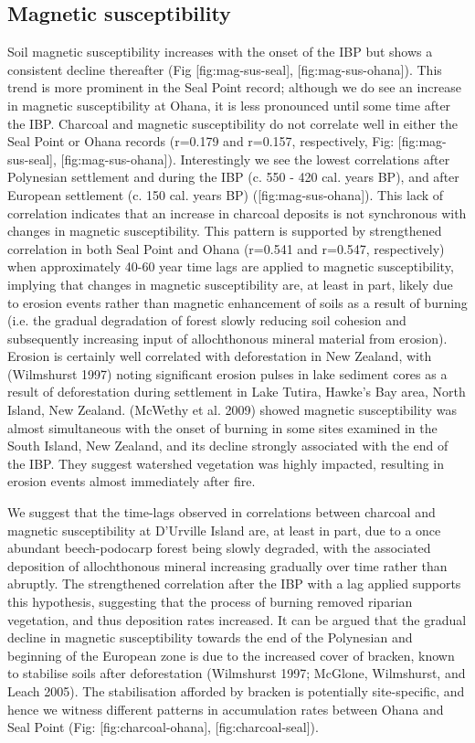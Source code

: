\documentclass[]{article}
\begin{document}
\subsection{Magnetic susceptibility}\label{magnetic-susceptibility-2}

Soil magnetic susceptibility increases with the onset of the IBP but shows a consistent decline thereafter (Fig {[}fig:mag-sus-seal{]}, {[}fig:mag-sus-ohana{]}). This trend is more prominent in the Seal Point record; although we do see an increase in magnetic susceptibility at Ohana, it is less pronounced until some time after the IBP. Charcoal and magnetic susceptibility do not correlate well in either the Seal Point or Ohana records (r=0.179 and r=0.157, respectively, Fig: {[}fig:mag-sus-seal{]}, {[}fig:mag-sus-ohana{]}). Interestingly we see the lowest correlations after Polynesian settlement and during the IBP (c. 550 - 420 cal. years BP), and after European settlement (c. 150 cal. years BP) ({[}fig:mag-sus-ohana{]}). This lack of correlation indicates that an increase in charcoal deposits is not synchronous with changes in magnetic susceptibility. This pattern is supported by strengthened correlation in both Seal Point and Ohana (r=0.541 and r=0.547, respectively) when approximately 40-60 year time lags are applied to magnetic susceptibility, implying that changes in magnetic susceptibility are, at least in part, likely due to erosion events rather than magnetic enhancement of soils as a result of burning (i.e. the gradual degradation of forest slowly reducing soil cohesion and subsequently increasing input of allochthonous mineral material from erosion). Erosion is certainly well correlated with deforestation in New Zealand, with (Wilmshurst 1997) noting significant erosion pulses in lake sediment cores as a result of deforestation during settlement in Lake Tutira, Hawke's Bay area, North Island, New Zealand. (McWethy et al. 2009) showed magnetic susceptibility was almost simultaneous with the onset of burning in some sites examined in the South Island, New Zealand, and its decline strongly associated with the end of the IBP. They suggest watershed vegetation was highly impacted, resulting in erosion events almost immediately after fire.

We suggest that the time-lags observed in correlations between charcoal and magnetic susceptibility at D'Urville Island are, at least in part, due to a once abundant beech-podocarp forest being slowly degraded, with the associated deposition of allochthonous mineral increasing gradually over time rather than abruptly. The strengthened correlation after the IBP with a lag applied supports this hypothesis, suggesting that the process of burning removed riparian vegetation, and thus deposition rates increased. It can be argued that the gradual decline in magnetic susceptibility towards the end of the Polynesian and beginning of the European zone is due to the increased cover of bracken, known to stabilise soils after deforestation (Wilmshurst 1997; McGlone, Wilmshurst, and Leach 2005). The stabilisation afforded by bracken is potentially site-specific, and hence we witness different patterns in accumulation rates between Ohana and Seal Point (Fig: {[}fig:charcoal-ohana{]}, {[}fig:charcoal-seal{]}).
\end{document}
